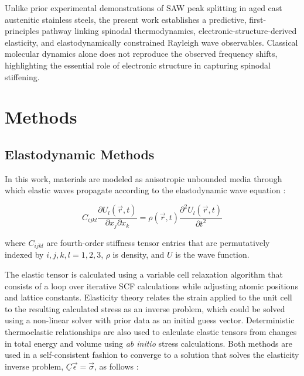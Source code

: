 \documentclass[final,3p,times]{elsarticle}
\begin{document}
Unlike prior experimental demonstrations of SAW peak splitting in aged cast austenitic stainless steels, the present work establishes a predictive, first-principles pathway linking spinodal thermodynamics, electronic-structure-derived elasticity, and elastodynamically constrained Rayleigh wave observables. Classical molecular dynamics alone does not reproduce the observed frequency shifts, highlighting the essential role of electronic structure in capturing spinodal stiffening.



\section{Methods}


\subsection{Elastodynamic Methods}
In this work, materials are modeled as anisotropic unbounded media through which elastic waves propagate according to the elastodynamic wave equation \cite{du2017facile}:

\begin{equation}
    C_{ijkl} \frac{\partial U_l(\vec{r},t)}{\partial x_j\partial x_k}= \rho(\vec{r},t)\frac{\partial^2 U_l(\vec{r},t)}{\partial t^2}
    \label{eqn:ewe}
\end{equation}

where $C_{ijkl}$ are fourth-order stiffness tensor entries that are permutatively indexed by $i,j,k,l=1,2,3$, $\rho$ is density, and $U$ is the wave function.

The elastic tensor is calculated using a variable cell relaxation algorithm that consists of a loop over iterative SCF calculations while adjusting atomic positions and lattice constants. Elasticity theory relates the strain applied to the unit cell to the resulting calculated stress as an inverse problem, which could be solved using a non-linear solver with prior data as an initial guess vector. Deterministic thermoelastic relationships are also used to calculate elastic tensors from changes in total energy and volume using \textit{ab initio} stress calculations. Both methods are used in a self-consistent fashion to converge to a solution that solves the elasticity inverse problem, $\underline{C}\vec{\epsilon} = \vec{\sigma}$, as follows \cite{timoshenko1951theory, mit1620}: 
\end{document}
